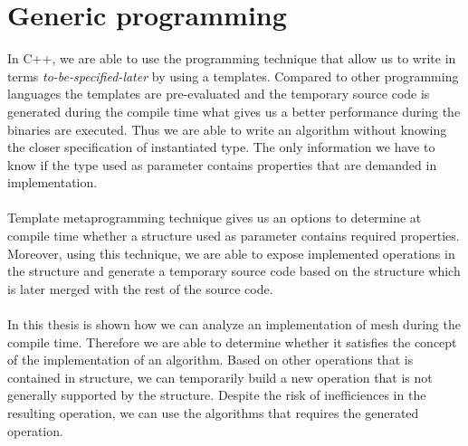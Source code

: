 \section*{Generic programming}

In C++, we are able to use the programming technique that allow us to write in terms
\emph{to-be-specified-later} by using a templates. Compared to other programming languages
the templates are pre-evaluated and the temporary source code is generated during the
compile time what gives us a better performance during the binaries are executed.
Thus we are able to write an algorithm
without knowing the closer specification of instantiated type. The only information we have
to know if the type used as parameter contains properties that are demanded in implementation.\\
\\
Template metaprogramming technique gives us an options to determine at compile time whether
a structure used as parameter contains required properties. Moreover, using this technique,
we are able to expose implemented operations in the structure and generate a temporary source
code based on the structure which is later merged with the rest of the source code.\\
\\
In this thesis is shown how we can analyze an implementation of mesh during the compile time.
Therefore we are able to determine whether it satisfies the concept of the implementation of
an algorithm. Based on other operations that is contained in structure, we can temporarily build a new
operation that is not generally supported by the structure. Despite the risk of inefficiences in
the resulting operation, we can use the algorithms that requires the generated operation.
